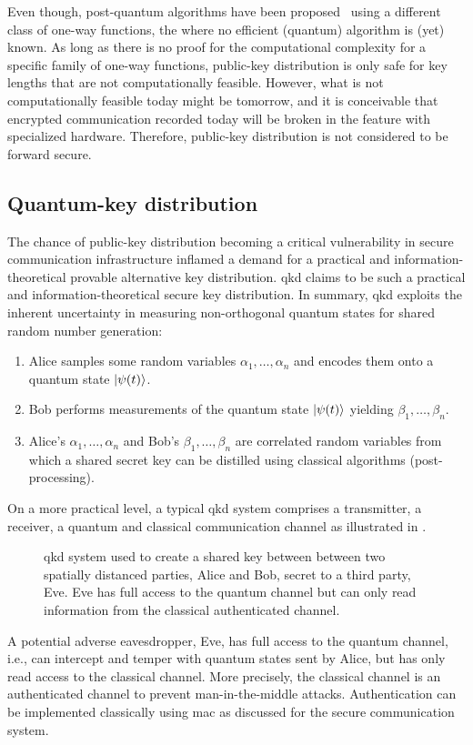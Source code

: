 Even though, post-quantum algorithms have been proposed~\cite{Bernstein2017,Chen2016} using a different class of one-way functions, the   where no efficient (quantum) algorithm is (yet) known.
As long as there is no proof for the computational complexity for a specific family of one-way functions, public-key distribution is only safe for key lengths that are not computationally feasible.
However, what is not computationally feasible today might be tomorrow, and it is conceivable that encrypted communication recorded today will be broken in the feature with specialized hardware.
Therefore, public-key distribution is not considered to be forward secure.

\FloatBarrier
\subsection{Quantum-key distribution}

The chance of public-key distribution becoming a critical vulnerability in secure communication infrastructure inflamed a demand for a practical and information-theoretical provable alternative key distribution.
\gls{qkd} claims to be such a practical and information-theoretical secure key distribution.
In summary, \gls{qkd} exploits the inherent uncertainty in measuring non-orthogonal quantum states for shared random number generation:
\begin{enumerate}
	\item Alice samples some random variables $\alpha_1,\dots,\alpha_n$ and encodes them onto a quantum state $\lvert\psi(t)\rangle$.
	\item Bob performs measurements of the quantum state $\lvert\psi(t)\rangle$ yielding $\beta_1,\dots,\beta_n$.
	\item Alice's $\alpha_1,\dots,\alpha_n$ and Bob's $\beta_1,\dots,\beta_n$ are correlated random variables from which a shared secret key can be distilled using classical algorithms (post-processing).
\end{enumerate}
On a more practical level, a typical \gls{qkd} system comprises a transmitter, a receiver, a quantum and classical communication channel as illustrated in .
\begin{figure}[htb]
	\centering
	
	\caption{\Gls{qkd} system used to create a shared key between between two spatially distanced parties, Alice and Bob, secret to a third party, Eve. Eve has full access to the quantum channel but can only read information from the classical authenticated channel.}\label{fig:qkd_system}
\end{figure}
A potential adverse eavesdropper, Eve, has full access to the quantum channel, i.e., can intercept and temper with quantum states sent by Alice, but has only read access to the classical channel.
More precisely, the classical channel is an authenticated channel to prevent man-in-the-middle attacks.
Authentication can be implemented classically using \gls{mac} as discussed for the secure communication system.

